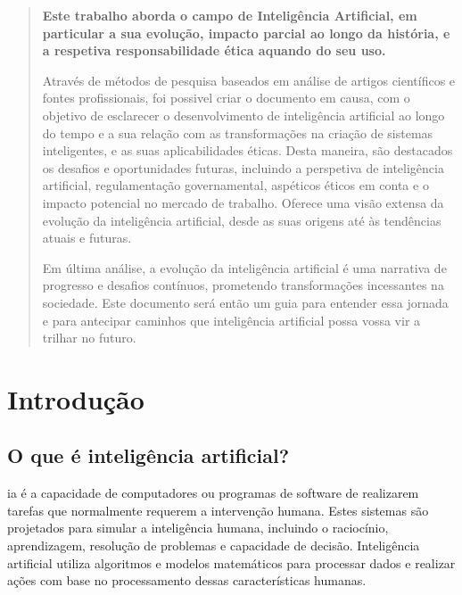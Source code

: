 \documentclass[a4paper, 11pt, onecolumn, oneside]{report}
\begin{document}
\begin{abstract}
\textbf{Este trabalho aborda o campo de Inteligência Artificial, em particular a sua evolução, impacto parcial ao longo da história, e a respetiva responsabilidade ética aquando do seu uso.}
\par
Através de métodos de pesquisa baseados em análise de artigos científicos e fontes profissionais, foi possivel criar o documento em causa, com o objetivo de esclarecer o desenvolvimento de inteligência artificial ao longo do tempo e a sua relação com as transformações na criação de sistemas inteligentes, e as suas aplicabilidades éticas.
Desta maneira, são destacados os desafios e oportunidades futuras, incluindo a perspetiva de inteligência artificial, regulamentação governamental, aspéticos éticos em conta e o impacto potencial no mercado de trabalho. Oferece uma visão extensa da evolução da inteligência artificial, desde as suas origens até às tendências atuais e futuras. 
\par
Em última análise, a evolução da inteligência artificial é uma narrativa de progresso e desafios contínuos, prometendo  transformações incessantes na sociedade. Este documento será então um guia para entender essa jornada e para antecipar caminhos que inteligência artificial possa vossa vir a trilhar no futuro.
\end{abstract}


\renewcommand{\contentsname}{Índice}
\tableofcontents
\listoftables

\listoffigures

\clearpage
{}
%
\chapter{Introdução}
\label{chap.introducao}

\section{O que é inteligência artificial?}
\ac{ia}\cite{artificial_intelligence} é a capacidade de computadores ou programas de software de realizarem tarefas que normalmente requerem a intervenção humana. Estes sistemas são projetados para simular a inteligência humana, incluindo o raciocínio, aprendizagem, resolução de problemas e capacidade de decisão. Inteligência artificial utiliza algoritmos e modelos matemáticos para processar dados e realizar ações com base no processamento dessas características humanas.
\end{document}
